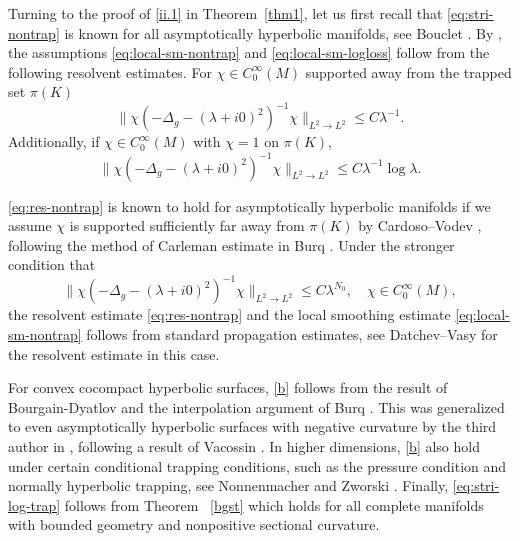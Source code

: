 \documentclass[10pt]{amsart}
\newcommand{\la}{\lambda}
\newcommand{\1}{{\bf 1}}
\begin{document}
Turning to the proof of \eqref{ii.1} in Theorem~\ref{thm1}, let us first recall that 
\eqref{eq:stri-nontrap} is known for all asymptotically hyperbolic manifolds, see Bouclet \cite[Theorem 1.2]{Boust}. 
By \cite[Theorem 7.2]{dyatlov2019mathematical}, the assumptions \eqref{eq:local-sm-nontrap} and \eqref{eq:local-sm-logloss} follow from the following resolvent estimates. For $\chi\in C_0^{\infty}(M)$ supported away from the trapped set $\pi(K)$
\begin{equation}\label{eq:res-nontrap}
    \|\chi (-\Delta_g-(\lambda+i0)^2)^{-1}\chi\|_{L^2\to L^2}\leq C\lambda^{-1}.
\end{equation} 
Additionally, if $\chi\in C_0^{\infty}(M)$ with $\chi=1$ on $\pi(K)$,
\begin{equation}\label{b}
    \|\chi(-\Delta_g-(\lambda+i0)^2)^{-1}\chi\|_{L^2\to L^2}\le C\la^{-1}\log\la.
\end{equation}


\eqref{eq:res-nontrap} is known to hold for asymptotically hyperbolic manifolds if we assume $\chi$ is supported sufficiently far away from $\pi(K)$ by Cardoso--Vodev \cite{Vodev}, following the method of Carleman estimate in Burq \cite{Burq98}. Under the stronger condition that 
\begin{equation}\label{eq:res-trap-lambdaN}
    \|\chi (-\Delta_g-(\lambda+i0)^2)^{-1}\chi\|_{L^2\to L^2}\leq C\lambda^{N_0},\quad \chi\in C_0^{\infty}(M),
\end{equation}
the resolvent estimate \eqref{eq:res-nontrap} and the local smoothing estimate \eqref{eq:local-sm-nontrap} follows from standard propagation estimates, see Datchev--Vasy \cite{DatVa12} for the resolvent estimate in this case.








For convex cocompact hyperbolic surfaces, \eqref{b} follows from the result of Bourgain-Dyatlov \cite[Theorem 2]{bourgain2018spectral} and the interpolation argument of Burq \cite[Lemma 4.7]{burq2004smoothing}. This was generalized to even asymptotically hyperbolic surfaces with negative curvature by the third author in \cite{tao2024spectral}, following a result of Vacossin \cite{vacossin}. In higher dimensions, \eqref{b} also hold under certain conditional trapping conditions, such as the pressure condition and normally hyperbolic trapping, see Nonnenmacher and Zworski \cite{nozw-pressure, nozw-normhyp}. Finally, \eqref{eq:stri-log-trap} follows from Theorem ~\ref{bgst} which holds for all complete manifolds with bounded geometry and nonpositive sectional curvature.  
\end{document}
